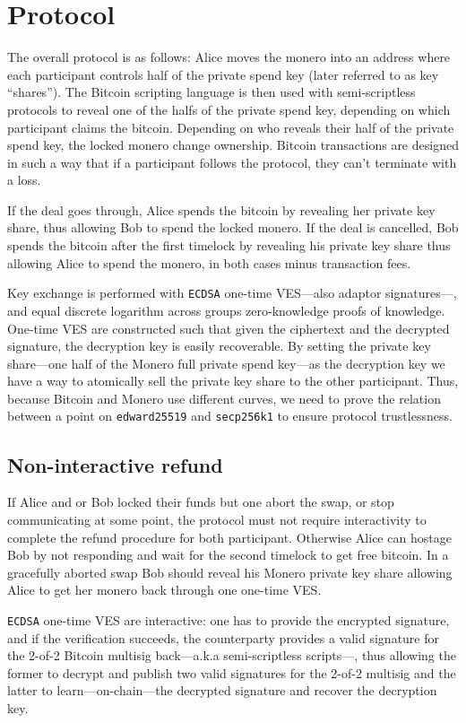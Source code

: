 \documentclass{llncs}
\begin{document}
\section{Protocol}
The overall protocol is as follows: Alice moves the monero into an address where each participant controls half of the private spend key (later referred to as key ``shares''). The Bitcoin scripting language is then used with semi-scriptless protocols to reveal one of the halfs of the private spend key, depending on which participant claims the bitcoin. Depending on who reveals their half of the private spend key, the locked monero change ownership. Bitcoin transactions are designed in such a way
that if a participant follows the protocol, they can't terminate with a loss.

If the deal goes through, Alice spends the bitcoin by revealing her private key share, thus allowing Bob to spend the locked monero. If the deal is cancelled, Bob spends the bitcoin after the first timelock by revealing his private key share thus allowing Alice to spend the monero, in both cases minus transaction fees.

Key exchange is performed with \texttt{ECDSA} one-time VES---also adaptor signatures---, and equal discrete logarithm across groups zero-knowledge proofs of knowledge. One-time VES are constructed such that given the ciphertext and the decrypted signature, the decryption key is easily recoverable.
By setting the private key share---one half of the Monero full private spend key---as the decryption key we have a way to atomically sell the private key share to the other participant. Thus, because Bitcoin and Monero use different curves, we need to prove the relation between a point on \texttt{edward25519} and \texttt{secp256k1} to ensure protocol trustlessness.

\subsection{Non-interactive refund}
If Alice and or Bob locked their funds but one abort the swap, or stop communicating at some point, the protocol must not require interactivity to complete the refund procedure for both participant. Otherwise Alice can hostage Bob by not responding and wait for the second timelock to get free bitcoin. In a gracefully aborted swap Bob should reveal his Monero private key share allowing Alice to get her monero back through one one-time VES.

\texttt{ECDSA} one-time VES are interactive: one has to provide the encrypted signature, and if the verification succeeds, the counterparty provides a valid signature for the 2-of-2 Bitcoin multisig back---a.k.a semi-scriptless scripts---, thus allowing the former to decrypt and publish two valid signatures for the 2-of-2 multisig and the latter to learn---on-chain---the decrypted signature and recover the decryption key.
\end{document}

